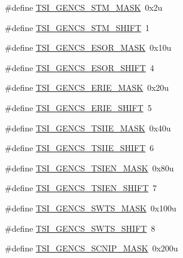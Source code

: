 \begin{DoxyCompactItemize}
\item 
\#define \hyperlink{group___t_s_i___register___masks_ga490fa9afb2591596712216cc7031cd47}{T\+S\+I\+\_\+\+G\+E\+N\+C\+S\+\_\+\+S\+T\+M\+\_\+\+M\+A\+SK}~0x2u
\item 
\#define \hyperlink{group___t_s_i___register___masks_ga4e08b4560fff0d44559e8dd48afcb4b0}{T\+S\+I\+\_\+\+G\+E\+N\+C\+S\+\_\+\+S\+T\+M\+\_\+\+S\+H\+I\+FT}~1
\item 
\#define \hyperlink{group___t_s_i___register___masks_ga1036a1740b9fd85ac9a7ee8c7b31fbc5}{T\+S\+I\+\_\+\+G\+E\+N\+C\+S\+\_\+\+E\+S\+O\+R\+\_\+\+M\+A\+SK}~0x10u
\item 
\#define \hyperlink{group___t_s_i___register___masks_ga2cdb34b848a822afc459c74893200fbb}{T\+S\+I\+\_\+\+G\+E\+N\+C\+S\+\_\+\+E\+S\+O\+R\+\_\+\+S\+H\+I\+FT}~4
\item 
\#define \hyperlink{group___t_s_i___register___masks_gae3ff8b7a00a0f1e53fd4b454858eb366}{T\+S\+I\+\_\+\+G\+E\+N\+C\+S\+\_\+\+E\+R\+I\+E\+\_\+\+M\+A\+SK}~0x20u
\item 
\#define \hyperlink{group___t_s_i___register___masks_ga834b781dd182ceb57eff9de0ab0ef82a}{T\+S\+I\+\_\+\+G\+E\+N\+C\+S\+\_\+\+E\+R\+I\+E\+\_\+\+S\+H\+I\+FT}~5
\item 
\#define \hyperlink{group___t_s_i___register___masks_gac1aa80b1c251525e1811471e72c00254}{T\+S\+I\+\_\+\+G\+E\+N\+C\+S\+\_\+\+T\+S\+I\+I\+E\+\_\+\+M\+A\+SK}~0x40u
\item 
\#define \hyperlink{group___t_s_i___register___masks_ga1ce2a7ae1f44df3b88d3028b2453f9c0}{T\+S\+I\+\_\+\+G\+E\+N\+C\+S\+\_\+\+T\+S\+I\+I\+E\+\_\+\+S\+H\+I\+FT}~6
\item 
\#define \hyperlink{group___t_s_i___register___masks_gafa7ce02781bc0e3d369d9a00a77b480f}{T\+S\+I\+\_\+\+G\+E\+N\+C\+S\+\_\+\+T\+S\+I\+E\+N\+\_\+\+M\+A\+SK}~0x80u
\item 
\#define \hyperlink{group___t_s_i___register___masks_ga503402dbca8eec965cad561df32e7cf5}{T\+S\+I\+\_\+\+G\+E\+N\+C\+S\+\_\+\+T\+S\+I\+E\+N\+\_\+\+S\+H\+I\+FT}~7
\item 
\#define \hyperlink{group___t_s_i___register___masks_ga3e70511a926ede552203b0d191591554}{T\+S\+I\+\_\+\+G\+E\+N\+C\+S\+\_\+\+S\+W\+T\+S\+\_\+\+M\+A\+SK}~0x100u
\item 
\#define \hyperlink{group___t_s_i___register___masks_gaf0cc5b9ce61c09cd8f5b64f85b3c11aa}{T\+S\+I\+\_\+\+G\+E\+N\+C\+S\+\_\+\+S\+W\+T\+S\+\_\+\+S\+H\+I\+FT}~8
\item 
\#define \hyperlink{group___t_s_i___register___masks_gaf7212a89bc45902f2ed4cee12a1ceb92}{T\+S\+I\+\_\+\+G\+E\+N\+C\+S\+\_\+\+S\+C\+N\+I\+P\+\_\+\+M\+A\+SK}~0x200u

\end{DoxyCompactItemize}
